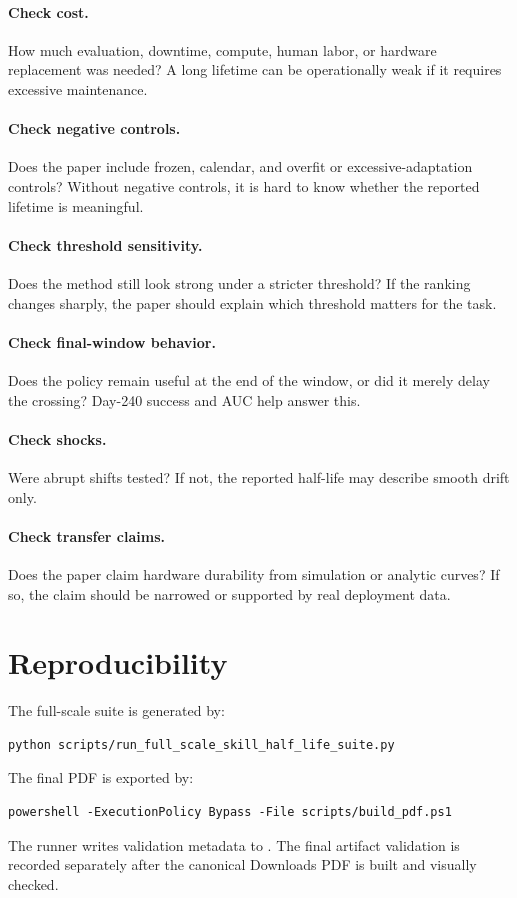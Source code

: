 \documentclass{article}
\begin{document}
\paragraph{Check cost.}
How much evaluation, downtime, compute, human labor, or hardware replacement was
needed? A long lifetime can be operationally weak if it requires excessive
maintenance.

\paragraph{Check negative controls.}
Does the paper include frozen, calendar, and overfit or excessive-adaptation
controls? Without negative controls, it is hard to know whether the reported
lifetime is meaningful.

\paragraph{Check threshold sensitivity.}
Does the method still look strong under a stricter threshold? If the ranking
changes sharply, the paper should explain which threshold matters for the task.

\paragraph{Check final-window behavior.}
Does the policy remain useful at the end of the window, or did it merely delay
the crossing? Day-240 success and AUC help answer this.

\paragraph{Check shocks.}
Were abrupt shifts tested? If not, the reported half-life may describe smooth
drift only.

\paragraph{Check transfer claims.}
Does the paper claim hardware durability from simulation or analytic curves?
If so, the claim should be narrowed or supported by real deployment data.

\section{Reproducibility}

The full-scale suite is generated by:
\begin{verbatim}
python scripts/run_full_scale_skill_half_life_suite.py
\end{verbatim}
The final PDF is exported by:
\begin{verbatim}
powershell -ExecutionPolicy Bypass -File scripts/build_pdf.ps1
\end{verbatim}
The runner writes validation metadata to
. The final artifact validation
is recorded separately after the canonical Downloads PDF is built and visually
checked.
\end{document}
